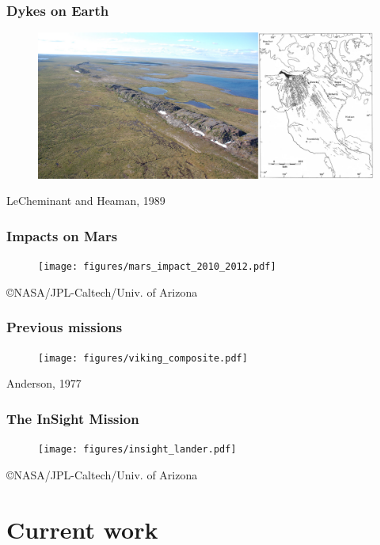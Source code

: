 \documentclass[compress,framenumber]{beamer}
\begin{document}
\begin{frame}
  \frametitle{Dykes on Earth}
  \vspace{-2.0em}
  \begin{figure}
    \includegraphics[width=0.95\linewidth]{figures/mackenzie_dyke_swarm}
  \end{figure}
\vspace{-1.0em}
\hfill LeCheminant and Heaman, 1989
\end{frame}


\begin{frame}
  \frametitle{Impacts on Mars}

  \vspace{-2.0em}
  \begin{figure}
    \texttt{[image: figures/mars\_impact\_2010\_2012.pdf]}
  \end{figure}

\hfill \copyright NASA/JPL-Caltech/Univ. of Arizona
\end{frame}

\begin{frame}
  \frametitle{Previous missions}
  \vspace{-2.0em}
  \begin{figure}
    \texttt{[image: figures/viking\_composite.pdf]}
  \end{figure}
\vspace{-1.0em}
\hfill Anderson, 1977
\end{frame}

\begin{frame}
  \frametitle{The InSight Mission}
  \vspace{-2.0em}
  \begin{figure}
    \texttt{[image: figures/insight\_lander.pdf]}
  \end{figure}
\hfill \copyright NASA/JPL-Caltech/Univ. of Arizona
\end{frame}




\section{Current work}
\end{document}
